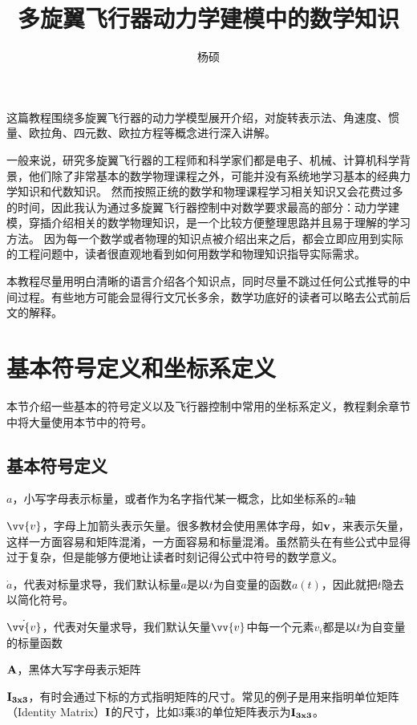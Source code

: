 \documentclass[11pt]{article}
\begin{document}
\title{多旋翼飞行器动力学建模中的数学知识}
\author{杨硕}

\maketitle
这篇教程围绕多旋翼飞行器的动力学模型展开介绍，对旋转表示法、角速度、惯量、欧拉角、四元数、欧拉方程等概念进行深入讲解。

一般来说，研究多旋翼飞行器的工程师和科学家们都是电子、机械、计算机科学背景，他们除了非常基本的数学物理课程之外，可能并没有系统地学习基本的经典力学知识和代数知识。
然而按照正统的数学和物理课程学习相关知识又会花费过多的时间，因此我认为通过多旋翼飞行器控制中对数学要求最高的部分：动力学建模，穿插介绍相关的数学物理知识，是一个比较方便整理思路并且易于理解的学习方法。
因为每一个数学或者物理的知识点被介绍出来之后，都会立即应用到实际的工程问题中，读者很直观地看到如何用数学和物理知识指导实际需求。

本教程尽量用明白清晰的语言介绍各个知识点，同时尽量不跳过任何公式推导的中间过程。有些地方可能会显得行文冗长多余，数学功底好的读者可以略去公式前后文的解释。

\section{基本符号定义和坐标系定义}
本节介绍一些基本的符号定义以及飞行器控制中常用的坐标系定义，教程剩余章节中将大量使用本节中的符号。
\subsection{基本符号定义}
$a$，小写字母表示标量，或者作为名字指代某一概念，比如坐标系的$x$轴

$\vv{v}$，字母上加箭头表示矢量。很多教材会使用黑体字母，如$\bf{v}$，来表示矢量，这样一方面容易和矩阵混淆，一方面容易和标量混淆。虽然箭头在有些公式中显得过于复杂，但是能够方便地让读者时刻记得公式中符号的数学意义。

$\dot{a}$，代表对标量求导，我们默认标量$a$是以$t$为自变量的函数$a(t)$，因此就把$t$隐去以简化符号。

$\dot{\vv{v}}$，代表对矢量求导，我们默认矢量$\vv{v}$中每一个元素$v_i$都是以$t$为自变量的标量函数

$\bf{A}$，黑体大写字母表示矩阵

$\bf{I}_{3x3}$，有时会通过下标的方式指明矩阵的尺寸。常见的例子是用来指明单位矩阵（Identity Matrix）$\bf{I}$的尺寸，比如3乘3的单位矩阵表示为$\bf{I}_{3x3}$。
\end{document}
